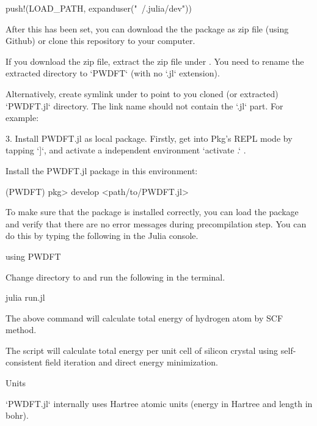 \begin{juliacode}
push!(LOAD_PATH, expanduser("~/.julia/dev"))
\end{juliacode}

  After this has been set, you can download the the package as zip file (using Github) or
  clone this repository to your computer.

  If you download the zip file, extract the zip file under
  . You need to rename the extracted directory
  to `PWDFT` (with no `.jl` extension).

Alternatively, create symlink under 
to point to you cloned (or extracted) `PWDFT.jl` directory. The link name should not
contain the `.jl` part. For example:


3. Install PWDFT.jl as local package. Firstly, get into Pkg's REPL mode by tapping `]`,
and activate a independent environment `activate .` .

Install the PWDFT.jl package in this environment:

\begin{textcode}
(PWDFT) pkg> develop <path/to/PWDFT.jl>
\end{textcode}

To make sure that the package is installed correctly, you can load the package
and verify that there are no error messages during precompilation step.
You can do this by typing the following in the Julia console.

\begin{juliacode}
using PWDFT
\end{juliacode}


Change directory to  and run the following in the terminal.

\begin{textcode}
julia run.jl
\end{textcode}

The above command will calculate total energy of hydrogen atom by SCF method.

The script will calculate total energy per unit cell of silicon crystal using
self-consistent field iteration and direct energy minimization.

Units

`PWDFT.jl` internally uses Hartree atomic units (energy in Hartree and length in bohr).

